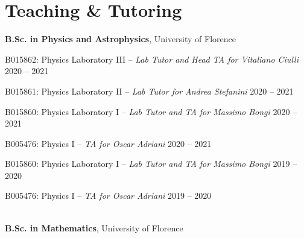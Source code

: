 \newcommand{\teaching}[2]
  {\normalsize \textbf{\color{hlcolor-0} #1}, {\color{hlcolor-1} #2}}
  
\newcommand{\teachclass}[3]
  {{\normalsize \color{maincolor} #1 --}
  {\small \color{maincolor} \emph{#2}} \hfill 
  {\normalsize \color{hlcolor-2} #3}}


\section*{Teaching \& Tutoring}
\begin{cvcontent}
  \teaching{B.Sc. in Physics and Astrophysics}{University of Florence}
  \\ [0.5mm]
  \begin{itemize*}[label=\textcolor{iconcolor}{\textbullet}]
    \item \teachclass{B015862: Physics Laboratory III}{Lab Tutor and Head TA for Vitaliano Ciulli}{2020 -- 2021}\\ [0.5mm]
    \item \teachclass{B015861: Physics Laboratory II}{Lab Tutor for Andrea Stefanini}{2020 -- 2021}\\ [0.5mm]
    \item \teachclass{B015860: Physics Laboratory I}{Lab Tutor and TA for Massimo Bongi}{2020 -- 2021}\\ [0.5mm]
    \item \teachclass{B005476: Physics I}{TA for Oscar Adriani}{2020 -- 2021}\\ [0.5mm]
    \item \teachclass{B015860: Physics Laboratory I}{Lab Tutor and TA for Massimo Bongi}{2019 -- 2020}\\ [0.5mm]
    \item \teachclass{B005476: Physics I}{TA for Oscar Adriani}{2019 -- 2020}
  \end{itemize*}
  \\ [3mm]
  \teaching{B.Sc. in Mathematics}{University of Florence}

\end{cvcontent}
